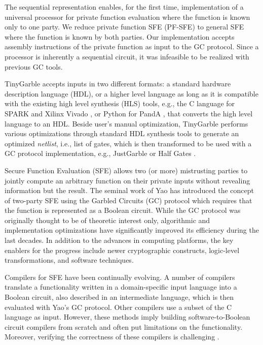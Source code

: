 The sequential representation enables, for the first time, implementation of a universal processor for private function evaluation where the function is known only to one party.
We reduce private function SFE (PF-SFE) to general SFE where the function is known by both parties.
Our implementation accepts assembly instructions of the private function as input to the GC protocol.
Since a processor is inherently a sequential circuit, it was infeasible to be realized with previous GC tools.

TinyGarble accepts inputs in two different formats: a standard hardware description language (HDL), or a higher level language as long as it is compatible with the existing high level synthesis (HLS) tools, e.g., the C language for  SPARK \cite{Gupta2004} and Xilinx Vivado \cite{tool:Vivado}, or Python for PandA \cite{tool:PandA}, that converts the high level language to an HDL.
Beside user's manual optimization, TinyGarble performs various optimizations through standard HDL synthesis tools to generate an optimized \emph{netlist}, i.e., list of gates, which is then transformed to be used with a GC protocol implementation, e.g., JustGarble \cite{bellare2013efficient} or Half Gates \cite{zahur2015two}.


Secure Function Evaluation (SFE) allows two (or more) mistrusting parties to jointly compute an arbitrary function on their private inputs without revealing information but the result. The seminal work of Yao \cite{yao1986generate} has introduced the concept of two-party SFE using the Garbled Circuits (GC) protocol which requires that the function is represented as a Boolean circuit. While the GC protocol was originally thought to be of theoretic interest only, algorithmic and implementation optimizations have significantly improved its efficiency during the last decades. In addition to the advances in computing platforms, the key enablers for the progress include newer cryptographic constructs, logic-level transformations, and software techniques.

Compilers for SFE have been continually evolving. A number of compilers~\cite{malkhi2004fairplay,ben2008fairplaymp,henecka2010tasty,kreuter2012billion} translate a functionality written in a domain-specific input language into a Boolean circuit, also described in an intermediate language, which is then evaluated with Yao's GC protocol. Other compilers \cite{franz2014cbmc,kreuter2013pcf} use a subset of the C language as input. However, these methods imply building software-to-Boolean circuit compilers from scratch and often put limitations on the functionality. Moreover, verifying the correctness of these compilers is challenging \cite{mood2016frigate}.

